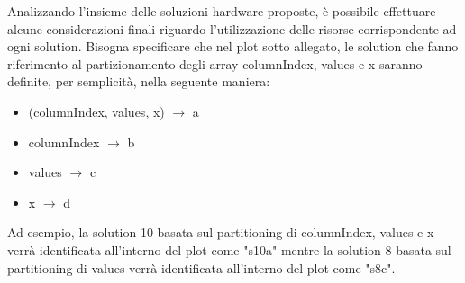 Analizzando l'insieme delle soluzioni hardware proposte, è possibile effettuare alcune considerazioni finali riguardo l'utilizzazione delle risorse corrispondente ad ogni solution. Bisogna specificare che nel plot sotto allegato, le solution che fanno riferimento al partizionamento degli array columnIndex, values e x saranno definite, per semplicità, nella seguente maniera:
\begin{itemize}
	\item (columnIndex, values, x) $\rightarrow$ a
	\item columnIndex $\rightarrow$ b
	\item values $\rightarrow$ c
	\item x $\rightarrow$ d
\end{itemize} 
Ad esempio, la solution 10 basata sul partitioning di columnIndex, values e x verrà identificata all'interno del plot come "s10a" mentre la solution 8 basata sul partitioning di values verrà identificata all'interno del plot come "s8c".

